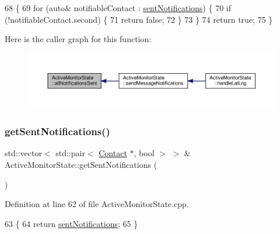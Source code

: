 \begin{DoxyCode}
68 \{
69     \textcolor{keywordflow}{for} (\textcolor{keyword}{auto}& notifiableContact : \hyperlink{class_active_monitor_state_a25493a87079926faf7d03b8587ad9f62}{sentNotifications}) \{
70         \textcolor{keywordflow}{if} (!notifiableContact.second) \{
71             \textcolor{keywordflow}{return} \textcolor{keyword}{false};
72         \}
73     \}
74     \textcolor{keywordflow}{return} \textcolor{keyword}{true};
75 \}
\end{DoxyCode}
Here is the caller graph for this function\+:\nopagebreak
\begin{figure}[H]
\begin{center}
\leavevmode
\includegraphics[width=350pt]{d9/db8/class_active_monitor_state_add557ab0dd0774482c08c982b82395e7_icgraph}
\end{center}
\end{figure}
\mbox{\label{class_active_monitor_state_ac1d5b33105abe5bd68ed5ee0396bc3be}} 
\subsubsection{\texorpdfstring{get\+Sent\+Notifications()}{getSentNotifications()}}
{\footnotesize\ttfamily std\+::vector$<$ std\+::pair$<$ \hyperlink{class_contact}{Contact} $\ast$, bool $>$ $>$ \& Active\+Monitor\+State\+::get\+Sent\+Notifications (\begin{DoxyParamCaption}{ }\end{DoxyParamCaption})}



Definition at line 62 of file Active\+Monitor\+State.\+cpp.


\begin{DoxyCode}
63 \{
64     \textcolor{keywordflow}{return} \hyperlink{class_active_monitor_state_a25493a87079926faf7d03b8587ad9f62}{sentNotifications};
65 \}
\end{DoxyCode}
\mbox{\label{class_active_monitor_state_ab94dede8d2e407aaddb0df056f5a329c}} 
